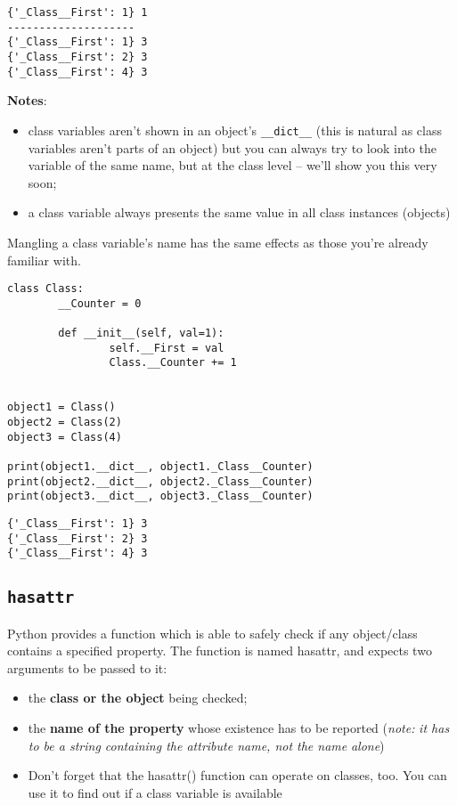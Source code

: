 \documentclass[11pt]{article}
\begin{document}
\begin{verbatim}
{'_Class__First': 1} 1
--------------------
{'_Class__First': 1} 3
{'_Class__First': 2} 3
{'_Class__First': 4} 3
\end{verbatim}

\textbf{Notes}:
\begin{itemize}
\item class variables aren’t shown in an object’s \texttt{\_\_dict\_\_} (this is
natural as class variables aren’t parts of an object) but you can
always try to look into the variable of the same name, but at the
class level – we’ll show you this very soon;
\item a class variable always presents the same value in all class
instances (objects)
\end{itemize}

Mangling a class variable’s name has the same effects as those you’re
already familiar with.

\begin{verbatim}
class Class:
        __Counter = 0

        def __init__(self, val=1):
                self.__First = val
                Class.__Counter += 1


object1 = Class()
object2 = Class(2)
object3 = Class(4)

print(object1.__dict__, object1._Class__Counter)
print(object2.__dict__, object2._Class__Counter)
print(object3.__dict__, object3._Class__Counter)

\end{verbatim}

\begin{verbatim}
{'_Class__First': 1} 3
{'_Class__First': 2} 3
{'_Class__First': 4} 3
\end{verbatim}


\newpage

\subsection{\texttt{hasattr}}
\label{sec:org3d880aa}
Python provides a function which is able to safely check if any
object/class contains a specified property. The function is named
hasattr, and expects two arguments to be passed to it:
\begin{itemize}
\item the \textbf{class or the object} being checked;
\item the \textbf{name of the property} whose existence has to be reported (\emph{note:}
\emph{it has to be a string containing the attribute name, not the name}
\emph{alone})
\item Don’t forget that the hasattr() function can operate on classes,
too. You can use it to find out if a class variable is available
\end{itemize}
\end{document}
